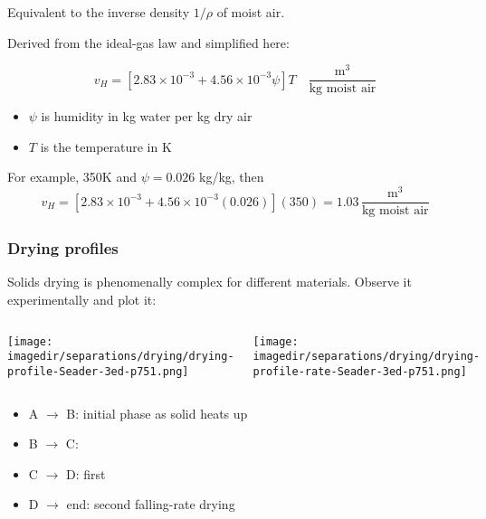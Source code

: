 \begin{frame}\frametitle{{\color{purple}{Humid volume}}}
	
	Equivalent to the inverse density $1/\rho$ of moist air.
	
	\vspace{12pt}
	Derived from the ideal-gas law and simplified here:
	\begin{exampleblock}{}
		\[ v_H = \left[ 2.83 \times 10^{-3} + 4.56 \times 10^{-3} \psi \right] T \quad \frac{\text{m}^3}{\text{kg moist air}} \]
	\end{exampleblock}
	\begin{itemize}
		\item	$\psi$ is humidity in kg water per kg dry air
		\item	$T$ is the temperature in K
	\end{itemize}
	
	\vspace{12pt}
	For example, 350K and $\psi = 0.026$ kg/kg, then 
	\[v_H = \left[2.83 \times 10^{-3} + 4.56 \times 10^{-3}(0.026)\right](350)  = 1.03\, \frac{\text{m}^3}{\text{kg moist air}}\]  
\end{frame}

\begin{frame}\frametitle{Drying profiles}
	Solids drying is phenomenally complex for different materials. Observe it experimentally and plot it:
	\begin{columns}[b]
			\begin{center}
				\texttt{[image: \\imagedir/separations/drying/drying-profile-Seader-3ed-p751.png]}
			\end{center}
			\begin{center}
				\texttt{[image: \\imagedir/separations/drying/drying-profile-rate-Seader-3ed-p751.png]}
			\end{center}
			\vspace{-7pt}
	\end{columns}

	\begin{itemize}
		\item	A $\rightarrow$ B: initial phase as solid heats up
		\item	B $\rightarrow$ C: {\color{purple}{constant-rate drying}}
		\item	C $\rightarrow$ D: first {\color{purple}{falling-rate drying}}
		\item	D $\rightarrow$ end: second falling-rate drying
	\end{itemize}
\end{frame}

